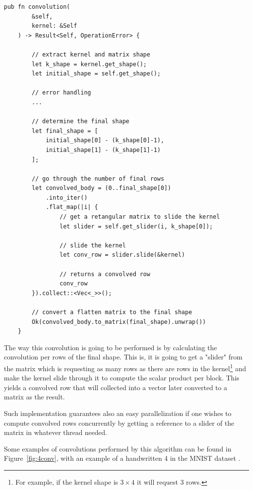 \begin{lstlisting}[label=lst:convprod,caption=Overview on the Convolutional Product implemented in the Renplex library using Rust.]
	pub fn convolution(
		&self, 
		kernel: &Self
	) -> Result<Self, OperationError> {
		
		// extract kernel and matrix shape
		let k_shape = kernel.get_shape();
		let initial_shape = self.get_shape();
		
		// error handling
		...
		
		// determine the final shape
		let final_shape = [
			initial_shape[0] - (k_shape[0]-1), 
			initial_shape[1] - (k_shape[1]-1)
		];
		
		// go through the number of final rows
		let convolved_body = (0..final_shape[0])
			.into_iter()
			.flat_map(|i| {
				// get a retangular matrix to slide the kernel
				let slider = self.get_slider(i, k_shape[0]);
				
				// slide the kernel
				let conv_row = slider.slide(&kernel)
				
				// returns a convolved row
				conv_row
		}).collect::<Vec<_>>();
		
		// convert a flatten matrix to the final shape
		Ok(convolved_body.to_matrix(final_shape).unwrap())
	}
\end{lstlisting}

The way this convolution is going to be performed is by calculating the convolution per rows of the final shape. This is, it is going to get a "slider" from the matrix which is requesting as many rows as there are rows in the kernel\footnote{For example, if the kernel shape is $ 3\times 4 $ it will request $ 3 $ rows.} and make the kernel slide through it to compute the scalar product per block. This yields a convolved row that will collected into a vector later converted to a matrix as the result.

Such implementation guarantees also an easy parallelization if one wishes to compute convolved rows concurrently by getting a reference to a slider of the matrix in whatever thread needed.

Some examples of convolutions performed by this algorithm can be found in Figure~\ref{fig:4conv}, with an example of a handwritten 4 in the MNIST dataset \parencite{lecun1998mnist}.

